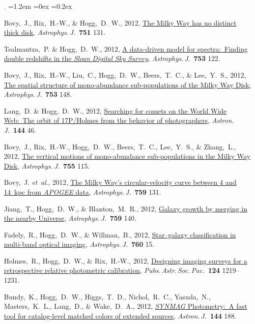 \documentclass[10pt,letterpaper]{article}
\newcommand{\foreign}[1]{\textsl{#1}}
\newcommand{\etal}{\foreign{et~al.}}
\newcommand{\project}[1]{\textsl{#1}}
\newcommand{\doi}[2]{\href{http://dx.doi.org/#1}{{#2}}}
\newcommand{\deemph}[1]{\textcolor{grey}{\footnotesize{#1}}}
\newcommand{\pubnumber}[1]{\deemph{{#1}.}}
\newcounter{refpubnum}
\newcommand{\hogglist}{%
    \rightmargin=0in
    \leftmargin=1.2em
    \topsep=0ex
    \partopsep=0pt
    \itemsep=0.2ex
    \parsep=0pt
    \itemindent=-1.0\leftmargin
    \listparindent=0.0\leftmargin
    \settowidth{\labelsep}{~}
    \usecounter{refpubnum}
  }
\begin{document}
\begin{list}{\pubnumber{\therefpubnum}}{\hogglist}
\item
Bovy,~J., Rix,~H.-W., \& Hogg,~D.~W., 2012,
\doi{10.1088/0004-637X/751/2/131}{The Milky Way has no distinct thick disk},
\textit{Astrophys.\,J.}\ \textbf{751} 131.
\item
Tsalmantza,~P. \& Hogg,~D.~W., 2012,
\doi{10.1088/0004-637X/753/2/122}{A data-driven model for spectra:\ Finding double redshifts in the \project{Sloan Digital Sky Survey}},
\textit{Astrophys.\,J.}\ \textbf{753} 122.
\item
Bovy,~J., Rix,~H.-W., Liu,~C., Hogg,~D.~W., Beers,~T.~C., \& Lee,~Y.~S., 2012,
\doi{10.1088/0004-637X/753/2/148}{The spatial structure of mono-abundance sub-populations of the Milky Way Disk},
\textit{Astrophys.\,J.}\ \textbf{753} 148.
\item
Lang,~D. \& Hogg,~D.~W., 2012,
\doi{10.1088/0004-6256/144/2/46}{Searching for comets on the World Wide Web:\ The orbit of 17P/Holmes from the behavior of photographers},
\textit{Astron.\,J.}\ \textbf{144} 46.
\item
Bovy,~J., Rix,~H.-W., Hogg,~D.~W., Beers,~T.~C., Lee,~Y.~S., \& Zhang,~L., 2012,
\doi{10.1088/0004-637X/755/2/115}{The vertical motions of mono-abundance sub-populations in the Milky Way Disk},
\textit{Astrophys.\,J.}\ \textbf{755} 115.
\item
Bovy,~J. \etal, 2012,
\doi{10.1088/0004-637X/759/2/131}{The Milky Way's circular-velocity curve between 4 and 14~kpc from \project{APOGEE} data},
\textit{Astrophys.\,J.}\ \textbf{759} 131.
\item
Jiang,~T., Hogg,~D.~W., \& Blanton,~M.~R., 2012,
\doi{10.1088/0004-637X/759/2/140}{Galaxy growth by merging in the nearby Universe},
\textit{Astrophys.\,J.}\ \textbf{759} 140.
\item
Fadely,~R., Hogg,~D.~W., \& Willman,~B., 2012,
\doi{10.1088/0004-637X/760/1/15}{Star--galaxy classification in multi-band optical imaging},
\textit{Astrophys.\,J.}\ \textbf{760} 15.
\item
Holmes,~R., Hogg,~D.~W., \& Rix,~H.-W., 2012,
\doi{10.1086/668656}{Designing imaging surveys for a retrospective relative photometric calibration},
\textit{Pubs.\,Astr.\,Soc.\,Pac.}\ \textbf{124} 1219--1231.
\item
Bundy,~K., Hogg,~D.~W., Higgs,~T.~D., Nichol,~R.~C., Yasuda,~N., Masters,~K.~L., Lang,~D.,
\& Wake,~D.~A., 2012,
\doi{10.1088/0004-6256/144/6/188}{\project{SYNMAG} Photometry:\ A fast tool for catalog-level matched colors of extended sources},
\textit{Astron.\,J.}\ \textbf{144} 188.
\item

\end{list}
\end{document}
